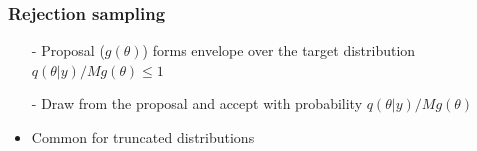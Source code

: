 \documentclass[10pt]{beamer}
\begin{document}
\begin{frame}

\frametitle{Rejection sampling}

    \vspace{-.3\baselineskip}
  \begin{itemize}
  \item[-] Proposal ($g(\theta)$) forms envelope over the target distribution ${q(\theta|y)}/{M g(\theta)} \leq 1$
  \item[-] Draw from the proposal and accept with probability ${q(\theta|y)}/{M g(\theta)}$
  \item<3>[-] Common for truncated distributions
  \end{itemize}

  \begin{center}
    \vspace{-1.6\baselineskip}
  \end{center}

\end{frame}
\end{document}
